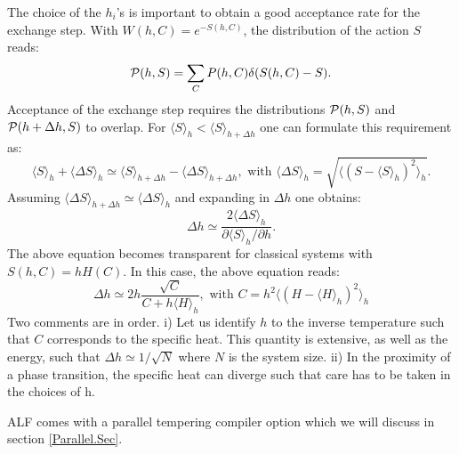 The choice of the   $h_i$'s  is important  to  obtain a good acceptance rate for the exchange step.  With  $W(h,C)  = e^{- S(h,C) }$, the  distribution of the action $S$  reads:
\begin{equation}
	 {\cal P}( h, S ) =   \sum_{C}     P( h,C )   \delta ( S(h,C) -  S ). 
\end{equation} 
Acceptance of the exchange  step requires the distributions  ${ \cal P}( h, S )  $ and       ${ \cal P}( h  + \Delta h , S )  $ to overlap. For 
$\langle S \rangle_{h}  < \langle S \rangle_{h +  \Delta h} $   one can formulate this  requirement as:
\begin{equation}
	\langle S \rangle_{h}  +\langle \Delta S \rangle_{h}   \simeq \langle S \rangle_{h +  \Delta h}  - \langle \Delta S \rangle_{h + \Delta h} ,  \text{    with   }   
\langle \Delta S \rangle_{h}   =  \sqrt{ \langle \left(    S -  \langle S   \rangle_h  	\right)^2 \rangle_h} .
\end{equation}
Assuming  $ \langle \Delta S \rangle_{h + \Delta h}  \simeq \langle \Delta S \rangle_{h} $  and expanding in $\Delta h$ one obtains: 
\begin{equation}
	\Delta h \simeq \frac{ 2  \langle \Delta S \rangle_{h}    }{ \partial \langle S \rangle_{h} / \partial h}.  
\end{equation} 
The above equation becomes transparent  for  classical systems  with $ S(h,C) =  h H(C) $.  In this case, the above equation reads: 
\begin{equation}
	\Delta h       \simeq  2 h \frac{  \sqrt{C} } { C    + h \langle H \rangle_h},  \text{   with  } C = h^2    \langle \left(  H -  \langle H   \rangle_h \right)^2 \rangle_h
\end{equation} 
Two comments are in order. i)    Let us identify $h$ to the inverse temperature  such that $C$ corresponds to the specific heat. This quantity is extensive,  as well as the energy, such that $ \Delta h \simeq 1/{\sqrt{N}} $ where $N$ is the system size.   ii) In the proximity of a phase transition,   the specific heat can diverge such that   care has to be taken in the choices of  h. 

 ALF  comes with a parallel tempering  compiler option which we will discuss  in section \ref{Parallel.Sec}. 
